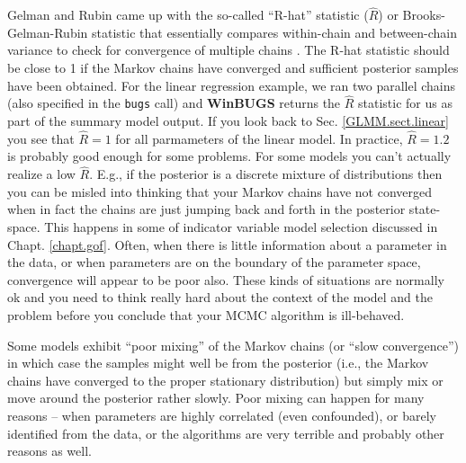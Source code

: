 Gelman and Rubin came up with the so-called ``R-hat''
statistic ($\hat{R}$) or Brooks-Gelman-Rubin statistic that
essentially compares within-chain and between-chain variance to check
for convergence of multiple chains \citep{gelman_etal:1996}. The R-hat statistic
should be close to 1 if the Markov chains have converged and
sufficient posterior samples have been obtained. For the linear regression example, we ran two parallel chains (also specified in the {\tt bugs} call) and {\bf WinBUGS} returns the $\hat{R}$ statistic for us as part of the summary model output. If you look back to Sec. \ref{GLMM.sect.linear} you see that $\hat{R} = 1$ for all parmameters of the linear model.
In practice, $\hat{R}
= 1.2$ is probably good enough for some problems.  For some models you
can't actually realize a low $\hat{R}$. E.g., if the posterior is a
discrete mixture of distributions then you can be misled into thinking
that your Markov chains have not converged when in fact the chains are
just jumping back and forth in the posterior state-space. This happens
in some of indicator variable model selection discussed in Chapt. \ref{chapt.gof}.
Often, when there is little information about a parameter in the data,
or when parameters are on the boundary of the parameter space,
convergence will appear to be poor also.
These kinds of situations 
are normally ok and you need to think really hard about
the context of the model and the problem before you conclude that your
MCMC algorithm is ill-behaved.

Some models exhibit ``poor mixing'' of the Markov chains (or ``slow
convergence'') in which case the samples might well be from the
posterior (i.e., the Markov chains have converged to the proper
stationary distribution) but simply mix or move around the posterior
rather slowly. Poor mixing can happen for many reasons -- when
parameters are highly correlated (even confounded), or barely
identified from the data, or the algorithms are very terrible and
probably other reasons as well.

